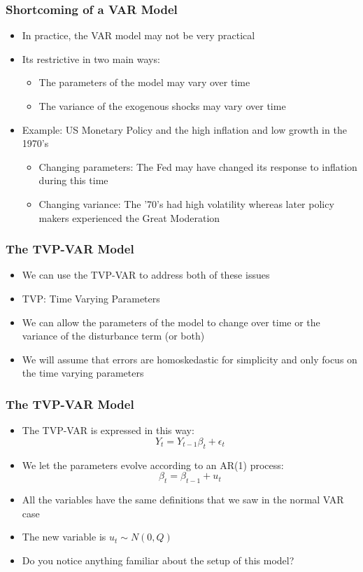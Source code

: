 \scshape\documentclass[xcolor=svgnames]{beamer}
\begin{document}
\begin{frame}
\frametitle{Shortcoming of a VAR Model}
\begin{itemize}
	\item  In practice, the VAR model may not be very practical
	\vspace{0.1 in}
	\item Its restrictive in two main ways:
	\begin{itemize}
		\item  The parameters of the model may vary over time
		\item  The variance of the exogenous shocks may vary over time
	\end{itemize}
	\vspace{0.1 in}
	\item  Example: US Monetary Policy and the high inflation and low growth in the 1970's
	\begin{itemize}
		\item  Changing parameters: The Fed may have changed its response to inflation during this time
		\item  Changing variance: The '70's had high volatility whereas later policy makers experienced the Great Moderation 
	\end{itemize}
\end{itemize}
\end{frame}

\begin{frame}
\frametitle{The TVP-VAR Model}
\begin{itemize}
	\item  We can use the TVP-VAR to address both of these issues
	\vspace{0.1 in}
	\item  TVP: Time Varying Parameters
	\vspace{0.1 in}
	\item  We can allow the parameters of the model to change over time or the variance of the disturbance term (or both)
	\vspace{0.1 in}
	\item  We will assume that errors are homoskedastic for simplicity and only focus on the time varying parameters
\end{itemize}
\end{frame}

\begin{frame}
\frametitle{The TVP-VAR Model}
\begin{itemize}
	\item  The TVP-VAR is expressed in this way:
	$$ Y_t =  Y_{t-1} \beta_t + \epsilon_t $$
	\item We let the parameters evolve according to an AR(1) process:
	$$ \beta_t = \beta_{t-1} + u_t $$
	\item  All the variables have the same definitions that we saw in the normal VAR case
	\vspace{0.1 in}
	\item  The new variable is $u_t \sim N(0,Q)$
	\vspace{0.1 in}
	\item  Do you notice anything familiar about the setup of this model?
\end{itemize}
\end{frame}
\end{document}
